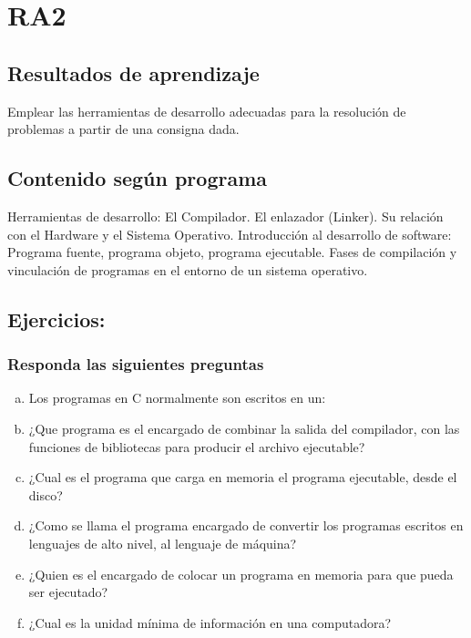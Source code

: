 \section{RA2}

\subsection*{Resultados de aprendizaje}
Emplear las herramientas de desarrollo adecuadas para la resolución de problemas a partir de una consigna dada.

\subsection*{Contenido según programa}
Herramientas de desarrollo: El Compilador. El enlazador (Linker). Su relación con el Hardware y el Sistema Operativo. Introducción al desarrollo de software: Programa fuente, programa objeto, programa ejecutable.  Fases de compilación y vinculación de programas en el entorno de un sistema operativo.

\setcounter{subsection}{1}
\subsection{Ejercicios:}

\subsubsection{Responda las siguientes preguntas}
\begin{enumerate}[a)]
  \item Los programas en C normalmente son escritos en un:
  \item ¿Que programa es el encargado de combinar la salida del compilador, con las funciones de bibliotecas para producir el archivo ejecutable?
  \item ¿Cual es el programa que carga en memoria el programa ejecutable, desde el disco?
  \item ¿Como se llama el programa encargado de convertir los programas escritos en lenguajes de alto nivel, al lenguaje 
    de máquina?
  \item ¿Quien es el encargado de colocar un programa en memoria para que pueda ser ejecutado?
  \item ¿Cual es la unidad mínima de información en una computadora?
\end{enumerate}
